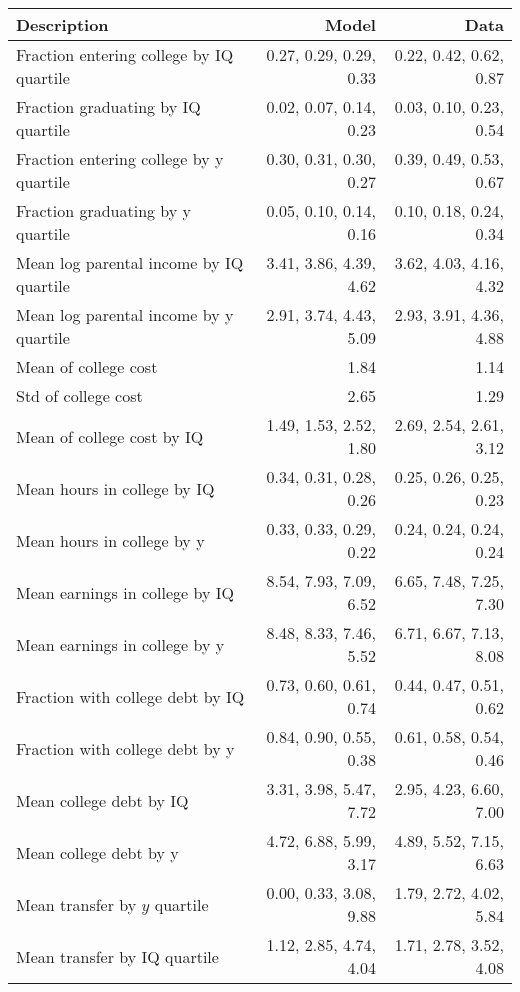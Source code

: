 \begin{tabular}{lrr}
\hline
Description & Model  & Data  \\
\hline
Fraction entering college by IQ quartile & 0.27, 0.29, 0.29, 0.33  & 0.22, 0.42, 0.62, 0.87  \\
Fraction graduating by IQ quartile & 0.02, 0.07, 0.14, 0.23  & 0.03, 0.10, 0.23, 0.54  \\
Fraction entering college by y quartile & 0.30, 0.31, 0.30, 0.27  & 0.39, 0.49, 0.53, 0.67  \\
Fraction graduating by y quartile & 0.05, 0.10, 0.14, 0.16  & 0.10, 0.18, 0.24, 0.34  \\
Mean log parental income by IQ quartile & 3.41, 3.86, 4.39, 4.62  & 3.62, 4.03, 4.16, 4.32  \\
Mean log parental income by y quartile & 2.91, 3.74, 4.43, 5.09  & 2.93, 3.91, 4.36, 4.88  \\
Mean of college cost & 1.84  & 1.14  \\
Std of college cost & 2.65  & 1.29  \\
Mean of college cost by IQ & 1.49, 1.53, 2.52, 1.80  & 2.69, 2.54, 2.61, 3.12  \\
Mean hours in college by IQ & 0.34, 0.31, 0.28, 0.26  & 0.25, 0.26, 0.25, 0.23  \\
Mean hours in college by y & 0.33, 0.33, 0.29, 0.22  & 0.24, 0.24, 0.24, 0.24  \\
Mean earnings in college by IQ & 8.54, 7.93, 7.09, 6.52  & 6.65, 7.48, 7.25, 7.30  \\
Mean earnings in college by y & 8.48, 8.33, 7.46, 5.52  & 6.71, 6.67, 7.13, 8.08  \\
Fraction with college debt by IQ & 0.73, 0.60, 0.61, 0.74  & 0.44, 0.47, 0.51, 0.62  \\
Fraction with college debt by y & 0.84, 0.90, 0.55, 0.38  & 0.61, 0.58, 0.54, 0.46  \\
Mean college debt by IQ & 3.31, 3.98, 5.47, 7.72  & 2.95, 4.23, 6.60, 7.00  \\
Mean college debt by y & 4.72, 6.88, 5.99, 3.17  & 4.89, 5.52, 7.15, 6.63  \\
Mean transfer by $y$ quartile & 0.00, 0.33, 3.08, 9.88  & 1.79, 2.72, 4.02, 5.84  \\
Mean transfer by IQ quartile & 1.12, 2.85, 4.74, 4.04  & 1.71, 2.78, 3.52, 4.08  \\
\hline
\end{tabular}%
